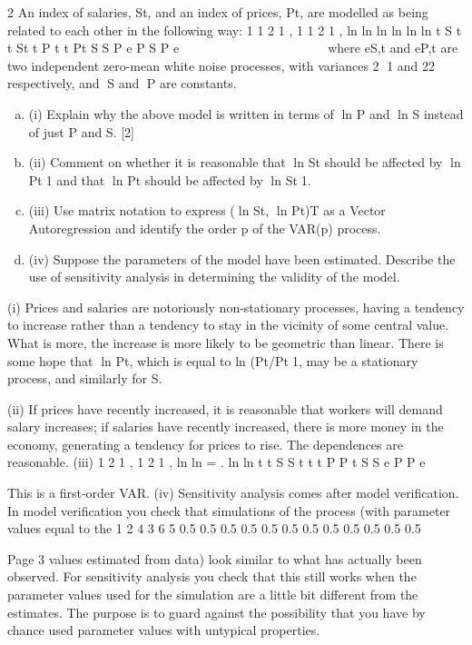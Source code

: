 \documentclass[a4paper,12pt]{article}
\begin{document}
2 An index of salaries, St, and an index of prices, Pt, are modelled as being related to
each other in the following way:
1 1 2 1 ,
1 1 2 1 ,
ln ln ln
ln ln ln
t S t t St
t P t t Pt
S S P e
P S P e
 
 
    
    
where eS,t and eP,t are two independent zero-mean white noise processes, with
variances 2
1 and 22
 respectively, and S and P are constants.
\begin{enumerate}[(a)]
\item (i) Explain why the above model is written in terms of ln P and ln S instead of
just P and S. [2]
\item (ii) Comment on whether it is reasonable that ln St should be affected by
ln Pt1 and that ln Pt should be affected by ln St1. 
\item (iii) Use matrix notation to express (ln St, ln Pt)T as a Vector Autoregression
and identify the order p of the VAR(p) process. 
\item (iv) Suppose the parameters of the model have been estimated. Describe the use of
sensitivity analysis in determining the validity of the model. 
\end{enumerate}
 (i) Prices and salaries are notoriously non-stationary processes, having a tendency
to increase rather than a tendency to stay in the vicinity of some central value.
What is more, the increase is more likely to be geometric than linear. There is
some hope that {ln Pt}, which is equal to {ln (Pt/Pt1}, may be a stationary
process, and similarly for S.

(ii) If prices have recently increased, it is reasonable that workers will demand salary increases; if salaries have recently increased, there is more money in the economy, generating a tendency for prices to rise. The dependences are reasonable.
(iii) 1 2 1 ,
1 2 1 ,
ln ln
= .
ln ln
t t S S t
t t P P t
S S e
P P e


This is a first-order VAR.
(iv) Sensitivity analysis comes after model verification. In model verification you
check that simulations of the process (with parameter values equal to the
1 2 4
3 6 5
0.5 0.5
0.5 0.5
0.5
0.5 0.5 0.5
0.5 0.5
0.5 0.5

Page 3
values estimated from data) look similar to what has actually been observed.
For sensitivity analysis you check that this still works when the parameter
values used for the simulation are a little bit different from the estimates. The
purpose is to guard against the possibility that you have by chance used
parameter values with untypical properties.
\end{document}
